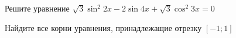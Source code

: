 \begin{ex}
	\begin{condition}
		\begin{enumcols}[label=\asbuk*)]
			\item Решите уравнение \( \sqrt{3}\sin^2 2x -2\sin 4x +\sqrt{3}\cos^2 3x = 0 \)
			\item Найдите все корни уравнения, принадлежащие отрезку \( \left[-1;1\right] \)
		\end{enumcols}
	\end{condition}
\end{ex}